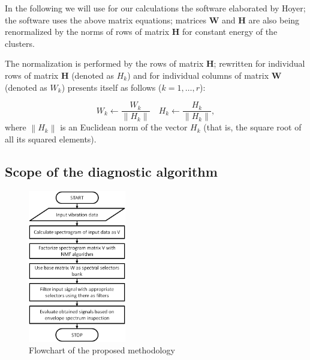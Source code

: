 \documentclass[journal]{IEEEtran}
\newcommand{\norm}[1]{\left\lVert#1\right\rVert}
\begin{document}
In the following we will use for our calculations the software elaborated by Hoyer; the software 
uses the above matrix equations; 
matrices \textbf{W} and \textbf{H} are also being renormalized by the norms of rows of matrix \textbf{H} for constant energy of the clusters. 




 The normalization is performed by the rows of matrix \textbf{H};  rewritten for individual rows of matrix \textbf{H} (denoted as ${H_{k}}$) and for individual columns of matrix \textbf{W}  (denoted as ${W_{k}}$) presents itself as follows ($k=1, \dots, r$):

\begin{equation}
    W_{k} \leftarrow \frac{W_{k}}{\norm{H_{k}}}
    \quad
    H_{k} \leftarrow \frac{H_{k}}{\norm{H_{k}}},
\end{equation}
where $\norm{H_{k}}$ is an Euclidean norm of the vector $H_{k}$ (that is, the square root 
of all its squared elements).


\subsection{Scope of the diagnostic algorithm}

\begin{figure}[!hb]
\centering
\includegraphics[width = 0.38\textwidth]{figs3/block.png}
\caption{Flowchart of the proposed methodology}
\label{fig: block}
\end{figure}
\end{document}
